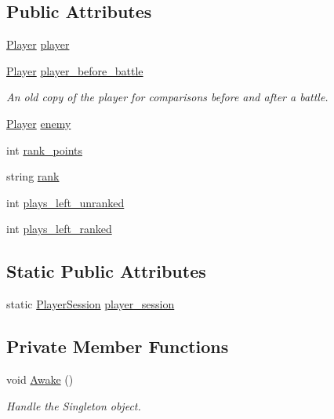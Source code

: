 \subsection*{Public Attributes}
\begin{DoxyCompactItemize}
\item 
\mbox{\hyperlink{class_player}{Player}} \mbox{\hyperlink{class_player_session_aca4d3def0c85712299f5528789df8110}{player}}
\item 
\mbox{\hyperlink{class_player}{Player}} \mbox{\hyperlink{class_player_session_ab9a2cc0cdf6740f1dcbea0cef56c636b}{player\+\_\+before\+\_\+battle}}
\begin{DoxyCompactList}\small\item\em An old copy of the player for comparisons before and after a battle. \end{DoxyCompactList}\item 
\mbox{\hyperlink{class_player}{Player}} \mbox{\hyperlink{class_player_session_abef83de04d9672e0af2c9313ecde1dc1}{enemy}}
\item 
int \mbox{\hyperlink{class_player_session_ac6cb4814f73c3e70feabc2d87d39ff3c}{rank\+\_\+points}}
\item 
string \mbox{\hyperlink{class_player_session_a40ae843028dbcdbdd441078b88ea5cd0}{rank}}
\item 
int \mbox{\hyperlink{class_player_session_a0e78485525b4c9cedb9056ad65767d94}{plays\+\_\+left\+\_\+unranked}}
\item 
int \mbox{\hyperlink{class_player_session_a297bef5c73fbe65dc70f914b066c7187}{plays\+\_\+left\+\_\+ranked}}
\end{DoxyCompactItemize}
\subsection*{Static Public Attributes}
\begin{DoxyCompactItemize}
\item 
static \mbox{\hyperlink{class_player_session}{Player\+Session}} \mbox{\hyperlink{class_player_session_acc6317b2b33507b267fc204419aa3ab9}{player\+\_\+session}}
\end{DoxyCompactItemize}
\subsection*{Private Member Functions}
\begin{DoxyCompactItemize}
\item 
void \mbox{\hyperlink{class_player_session_a5f382c3a86c0042bfad86f54299bb119}{Awake}} ()
\begin{DoxyCompactList}\small\item\em Handle the Singleton object. \end{DoxyCompactList}\end{DoxyCompactItemize}


